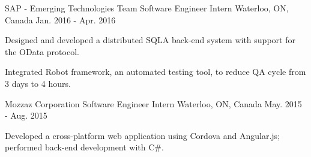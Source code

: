 \begin{cventries}
{\begin{cvitems}
\begin{itemize}[label=$\cdot$,leftmargin=0.7em]
\end{itemize}
\end{cvitems}
}
\cventry
{SAP - Emerging Technologies Team} %
{Software Engineer Intern} %
{Waterloo, ON, Canada} %
{Jan. 2016 - Apr. 2016} %
{ %
\begin{cvitems}
\item {Designed and developed a distributed SQLA back-end system with support for the OData protocol.}
\item {Integrated Robot framework, an automated testing tool, to reduce QA cycle from 3 days to 4 hours.}
\end{cvitems}
}
\cventry
{Mozzaz Corporation} %
{Software Engineer Intern} %
{Waterloo, ON, Canada} %
{May. 2015 - Aug. 2015} %
{ %
\begin{cvitems}
\item {Developed a cross-platform web application using Cordova and Angular.js; performed back-end development with C\#.}
\end{cvitems}
}

\end{cventries}
